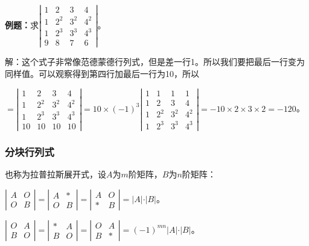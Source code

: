\documentclass[UTF8, 12pt]{ctexart}
\begin{document}
\textbf{例题：}求$\left|\begin{array}{cccc} 
    1 & 2 & 3 & 4 \\
    1 & 2^2  & 3^2 & 4^2 \\
    1 & 2^3  & 3^3 & 4^3 \\
    9 & 8 & 7 & 6
\end{array}\right|$。

解：这个式子非常像范德蒙德行列式，但是差一行1。所以我们要把最后一行变为同样值。可以观察得到第四行加最后一行为10，所以

$=\left|\begin{array}{cccc} 
    1 & 2 & 3 & 4 \\
    1 & 2^2  & 3^2 & 4^2 \\
    1 & 2^3  & 3^3 & 4^3 \\
    10 & 10 & 10 & 10
\end{array}\right|=10\times(-1)^3\left|\begin{array}{cccc} 
    1 & 1 & 1 & 1 \\
    1 & 2 & 3 & 4 \\
    1 & 2^2  & 3^2 & 4^2 \\
    1 & 2^3  & 3^3 & 4^3
\end{array}\right|=-10\times2\times3\times2=-120$。

\subsubsection{分块行列式}

也称为拉普拉斯展开式，设$A$为$m$阶矩阵，$B$为$n$阶矩阵：\medskip

$\left|\begin{array}{cc}
    A & O \\
    O & B
\end{array}\right|=
\left|\begin{array}{cc}
    A & * \\
    O & B
\end{array}\right|=
\left|\begin{array}{cc}
    A & O \\
    * & B
\end{array}\right|=\vert A\vert\cdot\vert B\vert$。

$\left|\begin{array}{cc}
    O & A \\
    B & O
\end{array}\right|=
\left|\begin{array}{cc}
    * & A \\
    B & O
\end{array}\right|=
\left|\begin{array}{cc}
    O & A \\
    B & *
\end{array}\right|=(-1)^{mn}\vert A\vert\cdot\vert B\vert$。
\end{document}
